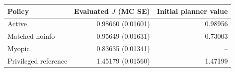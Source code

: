 \begin{center}\begin{tabular}{lrr}\toprule Policy & Evaluated $J$ (MC SE) & Initial planner value\\\midrule
Active & 0.98660 (0.01601) & 0.98956\\
Matched noinfo & 0.95649 (0.01631) & 0.73003\\
Myopic & 0.83635 (0.01341) & --\\
Privileged reference & 1.45179 (0.01560) & 1.47199\\
\bottomrule\end{tabular}\end{center}
